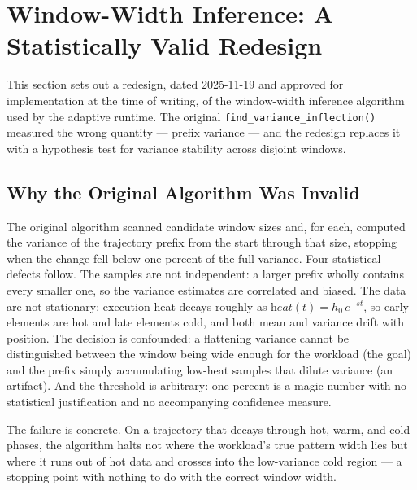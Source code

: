 
\section{Window-Width Inference: A Statistically Valid Redesign}

This section sets out a redesign, dated 2025-11-19 and approved for
implementation at the time of writing, of the window-width inference algorithm
used by the adaptive runtime. The original \texttt{find\_variance\_inflection()}
measured the wrong quantity --- prefix variance --- and the redesign replaces it
with a hypothesis test for variance stability across disjoint windows.

\subsection{Why the Original Algorithm Was Invalid}

The original algorithm scanned candidate window sizes and, for each, computed the
variance of the trajectory prefix from the start through that size, stopping when
the change fell below one percent of the full variance. Four statistical defects
follow. The samples are not independent: a larger prefix wholly contains every
smaller one, so the variance estimates are correlated and biased. The data are
not stationary: execution heat decays roughly as $\textit{heat}(t) = h_0\,
e^{-s t}$, so early elements are hot and late elements cold, and both mean and
variance drift with position. The decision is confounded: a flattening variance
cannot be distinguished between the window being wide enough for the workload (the
goal) and the prefix simply accumulating low-heat samples that dilute variance (an
artifact). And the threshold is arbitrary: one percent is a magic number with no
statistical justification and no accompanying confidence measure.

The failure is concrete. On a trajectory that decays through hot, warm, and cold
phases, the algorithm halts not where the workload's true pattern width lies but
where it runs out of hot data and crosses into the low-variance cold region --- a
stopping point with nothing to do with the correct window width.

